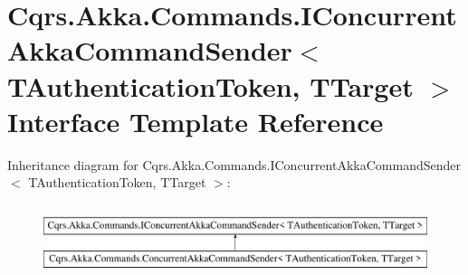 \hypertarget{interfaceCqrs_1_1Akka_1_1Commands_1_1IConcurrentAkkaCommandSender}{}\section{Cqrs.\+Akka.\+Commands.\+I\+Concurrent\+Akka\+Command\+Sender$<$ T\+Authentication\+Token, T\+Target $>$ Interface Template Reference}
\label{interfaceCqrs_1_1Akka_1_1Commands_1_1IConcurrentAkkaCommandSender}
Inheritance diagram for Cqrs.\+Akka.\+Commands.\+I\+Concurrent\+Akka\+Command\+Sender$<$ T\+Authentication\+Token, T\+Target $>$\+:\begin{figure}[H]
\begin{center}
\leavevmode
\includegraphics[height=2.000000cm]{interfaceCqrs_1_1Akka_1_1Commands_1_1IConcurrentAkkaCommandSender}
\end{center}
\end{figure}
